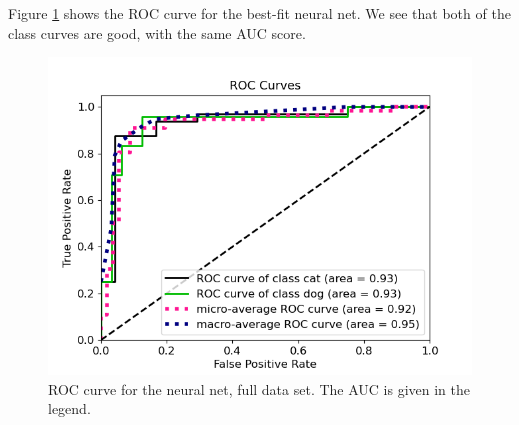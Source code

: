 \documentclass[a4paper]{article}
\begin{document}
Figure \ref{fig:nn_roc_nonpca} shows the ROC curve for the best-fit neural net. We see that both of the class curves are good, with the same AUC score.
\begin{figure}[H]
	\centering
	\includegraphics[scale=0.5]{../figures/neural_net/roc_nbins200_pca0_seed4155_ts0.20.png}
	\caption{ROC curve for the neural net, full data set. The AUC is given in the legend.}
	\label{fig:nn_roc_nonpca}
\end{figure}	
\end{document}
